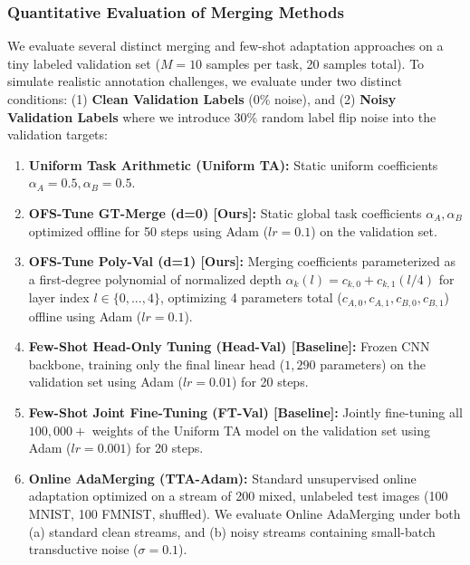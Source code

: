 \subsubsection{Quantitative Evaluation of Merging Methods}
We evaluate several distinct merging and few-shot adaptation approaches on a tiny labeled validation set ($M=10$ samples per task, 20 samples total). To simulate realistic annotation challenges, we evaluate under two distinct conditions: (1) \textbf{Clean Validation Labels} ($0\%$ noise), and (2) \textbf{Noisy Validation Labels} where we introduce $30\%$ random label flip noise into the validation targets:
\begin{enumerate}[noitemsep,topsep=0pt]
    \item \textbf{Uniform Task Arithmetic (Uniform TA):} Static uniform coefficients $\alpha_A = 0.5, \alpha_B = 0.5$.
    \item \textbf{OFS-Tune GT-Merge (d=0) [Ours]:} Static global task coefficients $\alpha_A, \alpha_B$ optimized offline for 50 steps using Adam ($lr=0.1$) on the validation set.
    \item \textbf{OFS-Tune Poly-Val (d=1) [Ours]:} Merging coefficients parameterized as a first-degree polynomial of normalized depth $\alpha_k(l) = c_{k,0} + c_{k,1} (l/4)$ for layer index $l \in \{0, ..., 4\}$, optimizing 4 parameters total ($c_{A,0}, c_{A,1}, c_{B,0}, c_{B,1}$) offline using Adam ($lr=0.1$).
    \item \textbf{Few-Shot Head-Only Tuning (Head-Val) [Baseline]:} Frozen CNN backbone, training only the final linear head ($1,290$ parameters) on the validation set using Adam ($lr=0.01$) for 20 steps.
    \item \textbf{Few-Shot Joint Fine-Tuning (FT-Val) [Baseline]:} Jointly fine-tuning all $100,000+$ weights of the Uniform TA model on the validation set using Adam ($lr=0.001$) for 20 steps.
    \item \textbf{Online AdaMerging (TTA-Adam):} Standard unsupervised online adaptation optimized on a stream of 200 mixed, unlabeled test images (100 MNIST, 100 FMNIST, shuffled). We evaluate Online AdaMerging under both (a) standard clean streams, and (b) noisy streams containing small-batch transductive noise ($\sigma = 0.1$).
\end{enumerate}

